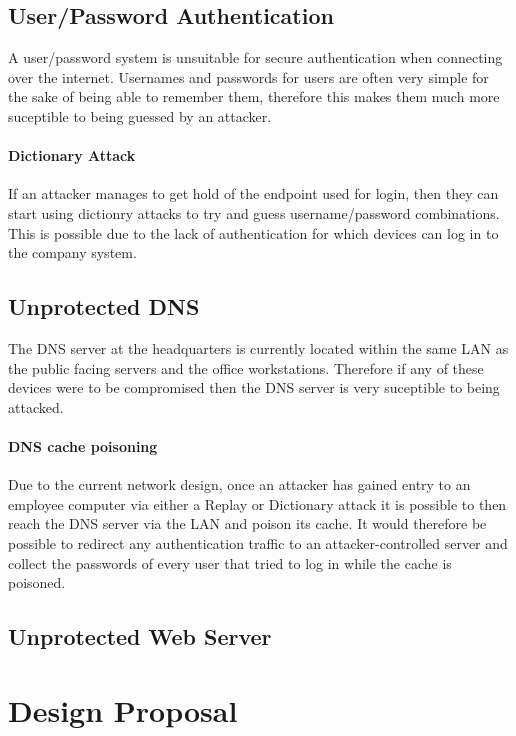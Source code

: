 \documentclass[11pt]{article}
\begin{document}
    \subsection{User/Password Authentication}
      A user/password system is unsuitable for secure authentication when connecting over the internet. Usernames and passwords for users are often very simple for the sake of being able to remember them, therefore this makes them much more suceptible to being guessed by an attacker.

      \paragraph{Dictionary Attack} %
        If an attacker manages to get hold of the endpoint used for login, then they can start using dictionry attacks to try and guess username/password combinations. This is possible due to the lack of authentication for which devices can log in to the company system.

    \subsection{Unprotected DNS}
      The DNS server at the headquarters is currently located within the same LAN as the public facing servers and the office workstations. Therefore if any of these devices were to be compromised then the DNS server is very suceptible to being attacked.

      \paragraph{DNS cache poisoning}
        Due to the current network design, once an attacker has gained entry to an employee computer via either a Replay or Dictionary attack it is possible to then reach the DNS server via the LAN and poison its cache. It would therefore be possible to redirect any authentication traffic to an attacker-controlled server and collect the passwords of every user that tried to log in while the cache is poisoned.

    \subsection{Unprotected Web Server}


    \section{Design Proposal}
\end{document}
